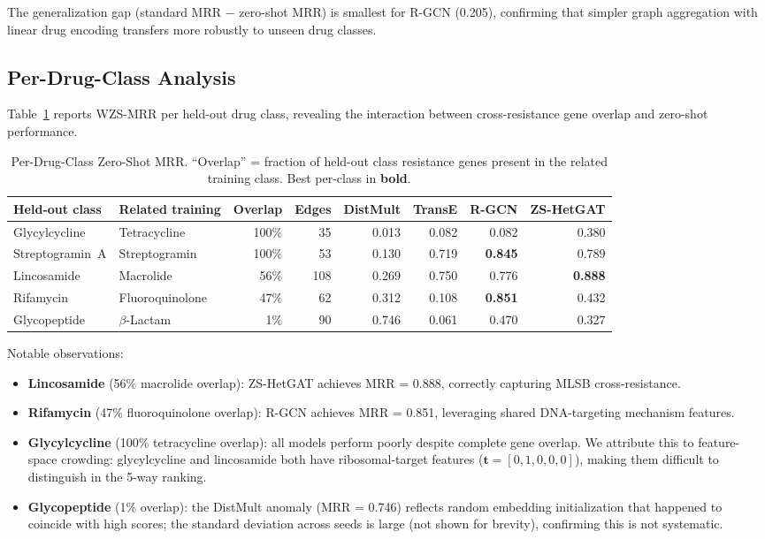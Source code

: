 \documentclass[conference]{IEEEtran}
\begin{document}
The generalization gap (standard MRR $-$ zero-shot MRR) is smallest
for R-GCN (0.205), confirming that simpler graph aggregation with
linear drug encoding transfers more robustly to unseen drug classes.

\subsection{Per-Drug-Class Analysis}
Table~\ref{tab:per_class} reports WZS-MRR per held-out drug class,
revealing the interaction between cross-resistance gene overlap and
zero-shot performance.

\begin{table}[t]
\centering
\caption{Per-Drug-Class Zero-Shot MRR. ``Overlap'' = fraction of
held-out class resistance genes present in the related training class.
Best per-class in \textbf{bold}.}
\label{tab:per_class}
\begin{tabular}{llrrrrrr}
\toprule
\textbf{Held-out class} & \textbf{Related training} & \textbf{Overlap} & \textbf{Edges}
  & \textbf{DistMult} & \textbf{TransE} & \textbf{R-GCN} & \textbf{ZS-HetGAT} \\
\midrule
Glycylcycline       & Tetracycline        & 100\% & 35
  & 0.013 & 0.082 & 0.082 & 0.380 \\
Streptogramin~A     & Streptogramin       & 100\% & 53
  & 0.130 & 0.719 & \textbf{0.845} & 0.789 \\
Lincosamide         & Macrolide           &  56\% & 108
  & 0.269 & 0.750 & 0.776 & \textbf{0.888} \\
Rifamycin           & Fluoroquinolone     &  47\% & 62
  & 0.312 & 0.108 & \textbf{0.851} & 0.432 \\
Glycopeptide        & $\beta$-Lactam      &   1\% & 90
  & 0.746 & 0.061 & 0.470 & 0.327 \\
\bottomrule
\end{tabular}
\end{table}

Notable observations:
\begin{itemize}
  \item \textbf{Lincosamide} (56\% macrolide overlap): ZS-HetGAT
        achieves MRR = 0.888, correctly capturing MLSB cross-resistance.
  \item \textbf{Rifamycin} (47\% fluoroquinolone overlap): R-GCN
        achieves MRR = 0.851, leveraging shared DNA-targeting mechanism
        features.
  \item \textbf{Glycylcycline} (100\% tetracycline overlap): all
        models perform poorly despite complete gene overlap. We
        attribute this to feature-space crowding: glycylcycline and
        lincosamide both have ribosomal-target features
        ($\mathbf{t} = [0,1,0,0,0]$), making them difficult to
        distinguish in the 5-way ranking.
  \item \textbf{Glycopeptide} (1\% overlap): the DistMult anomaly
        (MRR = 0.746) reflects random embedding initialization that
        happened to coincide with high scores; the standard deviation
        across seeds is large (not shown for brevity), confirming this
        is not systematic.
\end{itemize}
\end{document}

